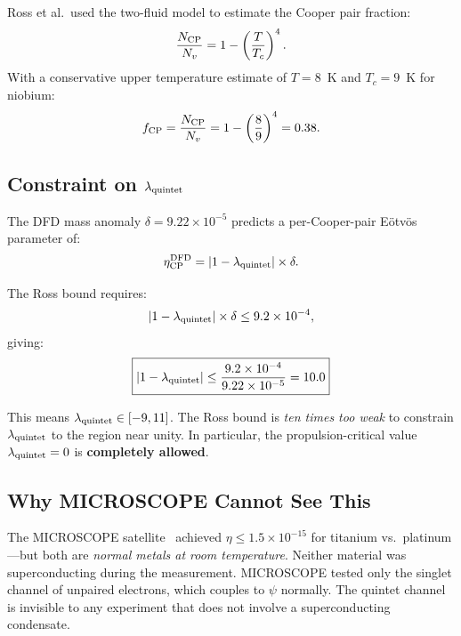 \documentclass[12pt,a4paper]{article}
\theoremstyle{definition}
\theoremstyle{remark}
\begin{document}
Ross et al.\ used the two-fluid model to estimate the Cooper pair fraction:
\begin{equation}
\frac{N_{\rm CP}}{N_v} = 1 - \left(\frac{T}{T_c}\right)^4.
\end{equation}
With a conservative upper temperature estimate of $T = 8$~K and $T_c = 9$~K
for niobium:
\begin{equation}
f_{\rm CP} = \frac{N_{\rm CP}}{N_v} = 1 - \left(\frac{8}{9}\right)^4 = 0.38.
\end{equation}

\subsection{Constraint on $\lambda_{\rm quintet}$}

The DFD mass anomaly $\delta = 9.22 \times 10^{-5}$ predicts a per-Cooper-pair
E\"otv\"os parameter of:
\begin{equation}
\eta_{\rm CP}^{\rm DFD} = |1 - \lambda_{\rm quintet}| \times \delta.
\end{equation}

The Ross bound requires:
\begin{equation}
|1 - \lambda_{\rm quintet}| \times \delta \leq 9.2 \times 10^{-4},
\end{equation}
giving:
\begin{equation}\label{eq:lambda_bound}
\boxed{|1 - \lambda_{\rm quintet}| \leq \frac{9.2 \times 10^{-4}}{9.22 \times 10^{-5}} = 10.0}
\end{equation}

This means $\lambda_{\rm quintet} \in [-9, 11]$.  The Ross bound is
\emph{ten times too weak} to constrain $\lambda_{\rm quintet}$ to the region
near unity.  In particular, the propulsion-critical value
$\lambda_{\rm quintet} = 0$ is \textbf{completely allowed}.

\subsection{Why MICROSCOPE Cannot See This}

The MICROSCOPE satellite~\cite{MICROSCOPE2022} achieved $\eta \leq 1.5 \times 10^{-15}$
for titanium vs.\ platinum---but both are \emph{normal metals at room temperature}.
Neither material was superconducting during the measurement.  MICROSCOPE tested
only the singlet channel of unpaired electrons, which couples to $\psi$ normally.
The quintet channel is invisible to any experiment that does not involve a
superconducting condensate.
\end{document}

